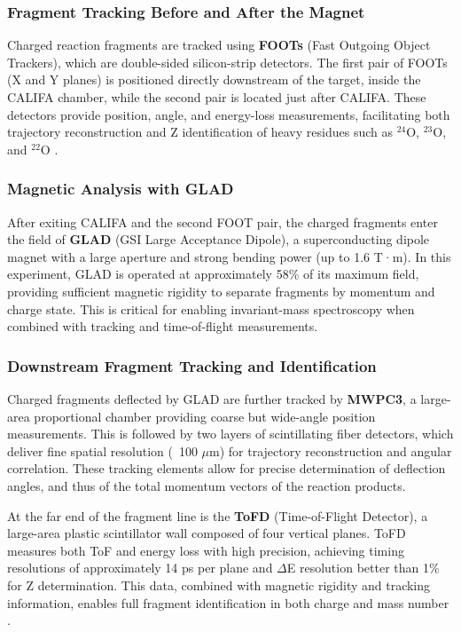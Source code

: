 \subsubsection{Fragment Tracking Before and After the Magnet}

Charged reaction fragments are tracked using \textbf{FOOTs} (Fast Outgoing Object Trackers), which are double-sided silicon-strip detectors. The first pair of FOOTs (X and Y planes) is positioned directly downstream of the target, inside the CALIFA chamber, while the second pair is located just after CALIFA. These detectors provide position, angle, and energy-loss measurements, facilitating both trajectory reconstruction and Z identification of heavy residues such as $^{24}$O, $^{23}$O, and $^{22}$O \cite{panin2024neutron}.


\subsubsection{Magnetic Analysis with GLAD}

After exiting CALIFA and the second FOOT pair, the charged fragments enter the field of \textbf{GLAD} (GSI Large Acceptance Dipole), a superconducting dipole magnet with a large aperture and strong bending power (up to 1.6 T·m). In this experiment, GLAD is operated at approximately 58\% of its maximum field, providing sufficient magnetic rigidity to separate fragments by momentum and charge state. This is critical for enabling invariant-mass spectroscopy when combined with tracking and time-of-flight measurements.


\subsubsection{Downstream Fragment Tracking and Identification}

Charged fragments deflected by GLAD are further tracked by \textbf{MWPC3}, a large-area proportional chamber providing coarse but wide-angle position measurements. This is followed by two layers of scintillating fiber detectors, which deliver fine spatial resolution (~100 $\mu$m) for trajectory reconstruction and angular correlation. These tracking elements allow for precise determination of deflection angles, and thus of the total momentum vectors of the reaction products.

At the far end of the fragment line is the \textbf{ToFD} (Time-of-Flight Detector), a large-area plastic scintillator wall composed of four vertical planes. ToFD measures both ToF and energy loss with high precision, achieving timing resolutions of approximately 14 ps per plane and $\Delta$E resolution better than 1\% for Z determination. This data, combined with magnetic rigidity and tracking information, enables full fragment identification in both charge and mass number \cite{heil_new_2022}.

